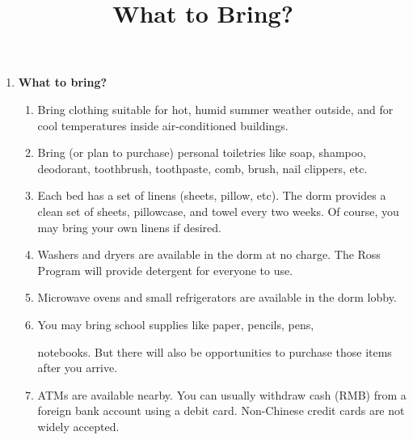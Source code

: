 \documentclass[11pt]{rossasia}
\title{What to Bring?}
\begin{document}
\maketitle
 \begin{enumerate}[label=(\arabic*),itemsep=2em,topsep=-1em]
\item \textbf{What to bring?}
 \begin{enumerate}[label=(\alph*),itemsep=0.5em,topsep=0em]
 \item Bring clothing suitable for hot, humid summer weather outside, and for 
   cool \linebreak temperatures inside air-conditioned buildings.  
\item Bring (or plan to
   purchase) personal toiletries like soap, shampoo, deodorant,
   toothbrush, toothpaste, comb, brush, nail clippers, etc.
 \item  Each bed has a set of linens (sheets, pillow, etc).
   The dorm provides a clean set of sheets, pillowcase, and towel 
   every two weeks.  Of course, you may bring your own linens
   if desired.
 \item Washers and dryers are available in the dorm at no charge.  The
   Ross Program will provide detergent for everyone to use.
 \item Microwave ovens and small refrigerators are available in
   the dorm lobby.  
\item You may bring school supplies like paper, pencils, pens,

   notebooks.  But there will also be opportunities to purchase those
   items after you arrive.
\item   ATMs are available nearby. 
    You can usually withdraw cash (RMB) from a\linebreak 
     foreign bank account using a debit card.
    Non-Chinese credit cards are not widely accepted.
\end{enumerate}


\end{enumerate}
\end{document}
